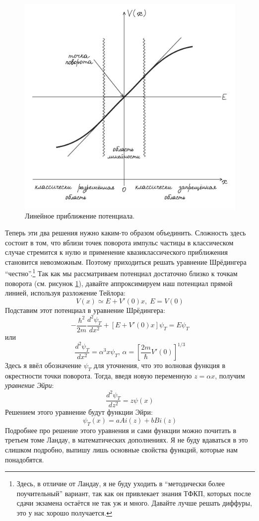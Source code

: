 \begin{figure}[ht]
\centering
\includegraphics[scale=0.28]{class 11/images/turning-point.jpg}
\caption{Линейное приближение потенциала.}
\label{fig 11.2}
\end{figure}

Теперь эти два решения нужно каким-то образом объединить. Сложность здесь состоит в том, что вблизи точек поворота импульс частицы в классическом случае стремится к нулю и применение квазиклассического приближения становится невозможным. Поэтому приходиться решать уравнение Шрёдингера ``честно''.\footnote{Здесь, в отличие от Ландау, я не буду уходить в ``методически более поучительный'' вариант, так как он привлекает знания ТФКП, которых после сдачи экзамена остаётся не так уж и много. Давайте лучше решать диффуры, это у нас хорошо получается.} Так как мы рассматриваем потенциал достаточно близко к точкам поворота (см. рисунок \ref{fig 11.2}), давайте аппроксимируем наш потенциал прямой линией, используя разложение Тейлора:
\[
V(x) \simeq E + V'(0)x,\; E = V(0)
\]
Подставим этот потенциал в уравнение Шрёдингера:
\[
-\frac{\hbar^2}{2m}\frac{d^2 \psi_T}{dx^2} + [E + V'(0)x]\psi_T = E\psi_T
\]
или
\[
\frac{d^2 \psi_T}{dx^2} = \alpha^3 x \psi_T, \, \alpha = \left[ \frac{2m}{\hbar} V'(0) \right]^{1/3}
\]
Здесь я ввёл обозначение $\psi_T$ для уточнения, что это волновая функция в окрестности точки поворота. Тогда, введя новую переменную $z = \alpha x$, получим \textit{уравнение Эйри}:
\[
\frac{d^2 \psi_T}{dz^2} = z\psi(x)
\]
Решением этого уравнение будут функции Эйри:
\[
\psi_T(x) = aAi(z) + bBi(z)
\]
Подробнее про решение этого уравнения и сами функции можно почитать в третьем томе Ландау, в математических дополнениях. Я не буду вдаваться в это слишком подробно, выпишу лишь основные свойства функций, которые нам понадобятся.

